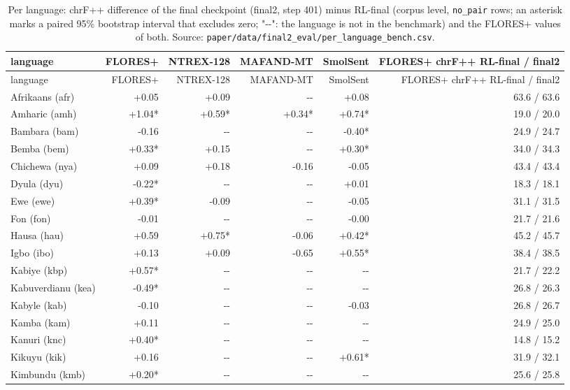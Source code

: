 {\footnotesize\setlength{\tabcolsep}{3pt}
\begin{longtable}[]{@{}lrrrrr@{}}
\caption{Per language: chrF++ difference of the final checkpoint (final2, step 401) minus RL-final (corpus level, \protect\texttt{no\_pair} rows; an asterisk marks a paired 95\% bootstrap interval that excludes zero; "-\/-": the language is not in the benchmark) and the FLORES+ values of both. Source: \protect\texttt{paper/data/final2\_eval/per\_language\_bench.csv}.}\label{tab:t_final2_perlang}\tabularnewline
\toprule\noalign{}
language & FLORES+ & NTREX-128 & MAFAND-MT & SmolSent & FLORES+ chrF++ RL-final / final2 \\
\midrule\noalign{}
\endfirsthead
\toprule\noalign{}
language & FLORES+ & NTREX-128 & MAFAND-MT & SmolSent & FLORES+ chrF++ RL-final / final2 \\
\midrule\noalign{}
\endhead
\bottomrule\noalign{}
\endlastfoot
Afrikaans (afr) & +0.05 & +0.09 & -\/- & +0.08 & 63.6 / 63.6 \\
Amharic (amh) & +1.04* & +0.59* & +0.34* & +0.74* & 19.0 / 20.0 \\
Bambara (bam) & -0.16 & -\/- & -\/- & -0.40* & 24.9 / 24.7 \\
Bemba (bem) & +0.33* & +0.15 & -\/- & +0.30* & 34.0 / 34.3 \\
Chichewa (nya) & +0.09 & +0.18 & -0.16 & -0.05 & 43.4 / 43.4 \\
Dyula (dyu) & -0.22* & -\/- & -\/- & +0.01 & 18.3 / 18.1 \\
Ewe (ewe) & +0.39* & -0.09 & -\/- & -0.05 & 31.1 / 31.5 \\
Fon (fon) & -0.01 & -\/- & -\/- & -0.00 & 21.7 / 21.6 \\
Hausa (hau) & +0.59 & +0.75* & -0.06 & +0.42* & 45.2 / 45.7 \\
Igbo (ibo) & +0.13 & +0.09 & -0.65 & +0.55* & 38.4 / 38.5 \\
Kabiye (kbp) & +0.57* & -\/- & -\/- & -\/- & 21.7 / 22.2 \\
Kabuverdianu (kea) & -0.49* & -\/- & -\/- & -\/- & 26.8 / 26.3 \\
Kabyle (kab) & -0.10 & -\/- & -\/- & -0.03 & 26.8 / 26.7 \\
Kamba (kam) & +0.11 & -\/- & -\/- & -\/- & 24.9 / 25.0 \\
Kanuri (knc) & +0.40* & -\/- & -\/- & -\/- & 14.8 / 15.2 \\
Kikuyu (kik) & +0.16 & -\/- & -\/- & +0.61* & 31.9 / 32.1 \\
Kimbundu (kmb) & +0.20* & -\/- & -\/- & -\/- & 25.6 / 25.8 \\

\end{longtable}}
